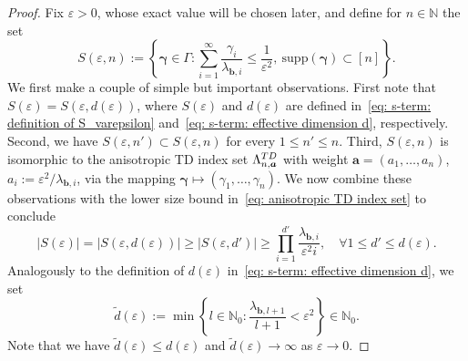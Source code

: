 \documentclass[namedate,webpdf]{ima-authoring-template-blank}
\newcommand*{\supp}{\mathrm{supp}}
\newcommand{\abs}[1]{\left|#1\right|}
\numberwithin{counter}{section}
\numberwithin{equation}{section}
\theoremstyle{plain}
\theoremstyle{definition}
\newcommand*{\bbN}{\mathbb{N}}
\newcommand*{\wtd}{\widetilde{d}}
\theoremstyle{thmstyletwo}
\begin{document}
\begin{proof}  
    Fix \(\varepsilon > 0\), whose exact value will be chosen later, and define for \(n \in \bbN\) the set
    \[
    S(\varepsilon, n) := \left\{\bm{\gamma} \in \Gamma: \sum_{i = 1}^{\infty} \frac{\gamma_i}{\lambda_{\bm{b},i}} \leq \frac{1}{\varepsilon^2}, \ \supp(\bm{\gamma}) \subset [n] \right\}.
    \]
    We first make a couple of simple but important observations. First note that \(S(\varepsilon) = S(\varepsilon, d(\varepsilon))\), where \(S(\varepsilon)\) and \(d(\varepsilon)\) are defined in~\eqref{eq: s-term: definition of S_varepsilon} and~\eqref{eq: s-term: effective dimension d}, respectively. Second, we have \(S(\varepsilon, n') \subset S(\varepsilon, n)\) for every \(1 \leq n' \leq n\). Third, \(S(\varepsilon, n)\) is isomorphic to the anisotropic TD index set \(\Lambda_{n, \bm{a}}^{\textup{TD}}\) with weight \(\bm{a} = (a_1, \dots, a_n)\), \(a_i := \varepsilon^2/\lambda_{\bm{b}, i}\), via the mapping \( \bm{\gamma} \mapsto (\gamma_1, \dots, \gamma_n) \). 
    We now combine these observations with the lower size bound in~\eqref{eq: anisotropic TD index set} to conclude
    \begin{equation}
    \label{eq: s-term: lower bound on size of S_varepsilon}
        \abs{S(\varepsilon)} 
        = \abs{S(\varepsilon, d(\varepsilon))} 
        \geq \abs{S(\varepsilon, d')} 
        \geq \prod_{i=1}^{d'} \frac{\lambda_{\bm{b},i}}{\varepsilon^2 i}, 
        \quad \forall 1 \leq d' \leq d(\varepsilon).
    \end{equation}
    Analogously to the definition of \(d(\varepsilon)\) in~\eqref{eq: s-term: effective dimension d}, we set
    \[
    \wtd(\varepsilon) 
    := \min \left\{ l \in \bbN_0: \frac{\lambda_{\bm{b}, l+1}}{l+1} < \varepsilon^2 \right\} \in \bbN_0.
    \]
    Note that we have \(\wtd(\varepsilon) \leq d(\varepsilon)\) and \(\wtd(\varepsilon) \to \infty\) as \(\varepsilon \to 0\).
    

\end{proof}
\end{document}

